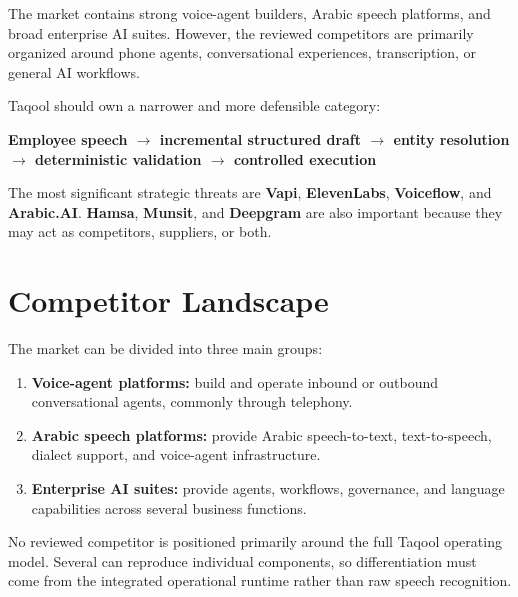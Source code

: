 \documentclass[10.5pt,a4paper]{article}
\newcommand{\BrandName}{Taqool}
\begin{document}
\begin{summarybox}
The market contains strong voice-agent builders, Arabic speech platforms,
and broad enterprise AI suites. However, the reviewed competitors are
primarily organized around phone agents, conversational experiences,
transcription, or general AI workflows.

\medskip

\BrandName{} should own a narrower and more defensible category:

\begin{center}
\textbf{Employee speech $\rightarrow$ incremental structured draft
$\rightarrow$ entity resolution $\rightarrow$ deterministic validation
$\rightarrow$ controlled execution}
\end{center}

The most significant strategic threats are \textbf{Vapi},
\textbf{ElevenLabs}, \textbf{Voiceflow}, and \textbf{Arabic.AI}.
\textbf{Hamsa}, \textbf{Munsit}, and \textbf{Deepgram} are also important
because they may act as competitors, suppliers, or both.
\end{summarybox}

\section{Competitor Landscape}

The market can be divided into three main groups:

\begin{enumerate}
  \item \textbf{Voice-agent platforms:} build and operate inbound or outbound
  conversational agents, commonly through telephony.

  \item \textbf{Arabic speech platforms:} provide Arabic speech-to-text,
  text-to-speech, dialect support, and voice-agent infrastructure.

  \item \textbf{Enterprise AI suites:} provide agents, workflows, governance,
  and language capabilities across several business functions.
\end{enumerate}

No reviewed competitor is positioned primarily around the full
\BrandName{} operating model. Several can reproduce individual components,
so differentiation must come from the integrated operational runtime rather
than raw speech recognition.
\end{document}
